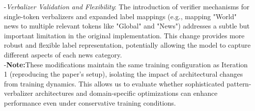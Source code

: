 \documentclass[11pt,a4paper]{article}
\begin{document}
\begin{itemize}[topsep=0pt]
  -\textit{Verbalizer Validation and Flexibility}: The introduction of verifier mechanisms for single-token verbalizers and expanded label mappings (e.g., mapping "World" news to multiple relevant tokens like "Global" and "News") addresses a subtle but important limitation in the original implementation. This change provides more robust and flexible label representation, potentially allowing the model to capture different aspects of each news category.\\
  -\textbf{Note:}These modifications maintain the same training configuration as Iteration 1 (reproducing the paper's setup), isolating the impact of architectural changes from training dynamics. This allows us to evaluate whether sophisticated pattern-verbalizer architectures and domain-specific optimizations can enhance performance even under conservative training conditions.
\end{itemize}
\end{document}
